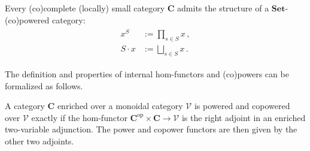     \begin{example}
        Every (co)complete (locally) small category $\mathbf{C}$ admits the structure of a $\mathbf{Set}$-(co)powered category:
        \begin{gather}
            \begin{aligned}
                x^S &:= \prod_{s\in S}x\,,\\
                S\cdot x &:= \bigsqcup_{s\in S}x\,.
            \end{aligned}
        \end{gather}
    \end{example}

    The definition and properties of internal hom-functors and (co)powers can be formalized as follows.
    \begin{property}
        A category $\mathbf{C}$ enriched over a monoidal category $\mathcal{V}$ is powered and copowered over $\mathcal{V}$ exactly if the hom-functor $\mathbf{C}^{\text{op}}\times\mathbf{C}\rightarrow\mathcal{V}$ is the right adjoint in an enriched two-variable adjunction. The power and copower functors are then given by the other two adjoints.
    \end{property}

